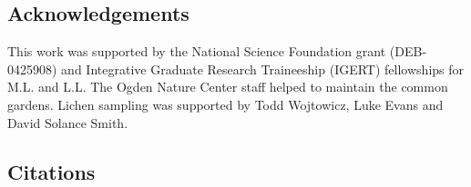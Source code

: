 \documentclass[fleqn,12pt]{olplainarticle}
\begin{document}
\subsection*{Acknowledgements}

This work was supported by the National Science Foundation grant
(DEB-0425908) and Integrative Graduate Research Traineeship (IGERT)
fellowships for M.L. and L.L. The Ogden Nature Center staff helped to
maintain the common gardens. Lichen sampling was supported by Todd
Wojtowicz, Luke Evans and David Solance Smith.






\subsection*{Citations}


\end{document}
